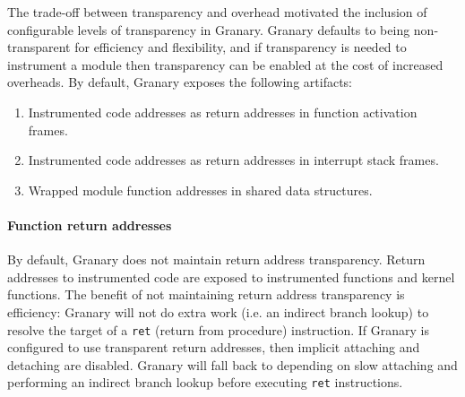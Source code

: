 \documentclass[letterpaper,twocolumn,10pt]{article}
\begin{document}
The trade-off between transparency and overhead motivated the inclusion of configurable levels of transparency in Granary. Granary defaults to being non-transparent for efficiency and flexibility, and if transparency is needed to instrument a module then transparency can be enabled at the cost of increased overheads. By default, Granary exposes the following artifacts: \begin{enumerate}
	\item Instrumented code addresses as return addresses in function activation frames.
	\item Instrumented code addresses as return addresses in interrupt stack frames.
	\item Wrapped module function addresses in shared data structures.
\end{enumerate}


\paragraph{Function return addresses} By default, Granary does not maintain return address transparency. Return addresses to instrumented code are exposed to instrumented functions and kernel functions. The benefit of not maintaining return address transparency is efficiency: Granary will not do extra work (i.e. an indirect branch lookup) to resolve the target of a \texttt{ret} (return from procedure) instruction. If Granary is configured to use transparent return addresses, then implicit attaching and detaching are disabled. Granary will fall back to depending on slow attaching and performing an indirect branch lookup before executing \texttt{ret} instructions.
\end{document}
